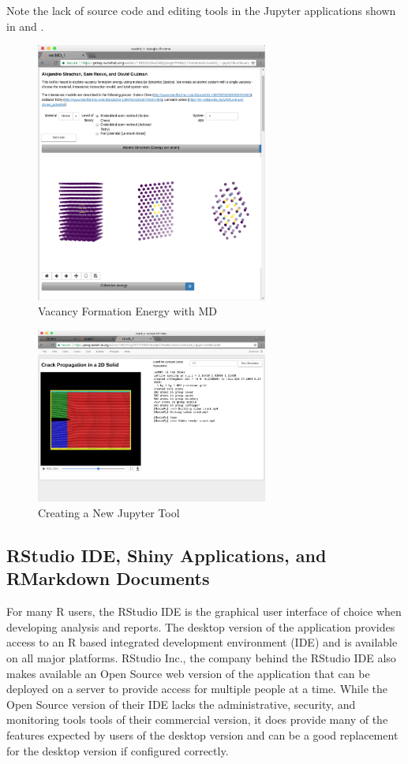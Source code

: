 \documentclass[conference]{../sty/IEEEtran}
\begin{document}
Note the lack of source code and editing tools in the Jupyter applications shown in
 and .

\begin{figure}[!h]
	\includegraphics[width=3in]{mdvacancy}
	\caption{Vacancy Formation Energy with MD \cite{mdvacancy}}
	\label{fig_mdvacancy}
\end{figure}

\begin{figure}[!h]
	\includegraphics[width=3in]{crack}
	\caption{Creating a New Jupyter Tool}
	\label{fig_crack}
\end{figure}


\subsection {RStudio IDE, Shiny Applications, and RMarkdown Documents}

For many R users, the RStudio IDE is the graphical user interface of choice
when developing analysis and reports. The desktop version of the application
provides access to an R based integrated development environment (IDE) and is
available on all major platforms. RStudio Inc., the company behind the RStudio
IDE also makes available an Open Source web version of the application that can
be deployed on a server to provide access for multiple people at a time. While
the Open Source version of their IDE lacks the administrative, security, and
monitoring tools tools of their commercial version, it does provide many of the
features expected by users of the desktop version and can be a good replacement
for the desktop version if configured correctly.
\end{document}
